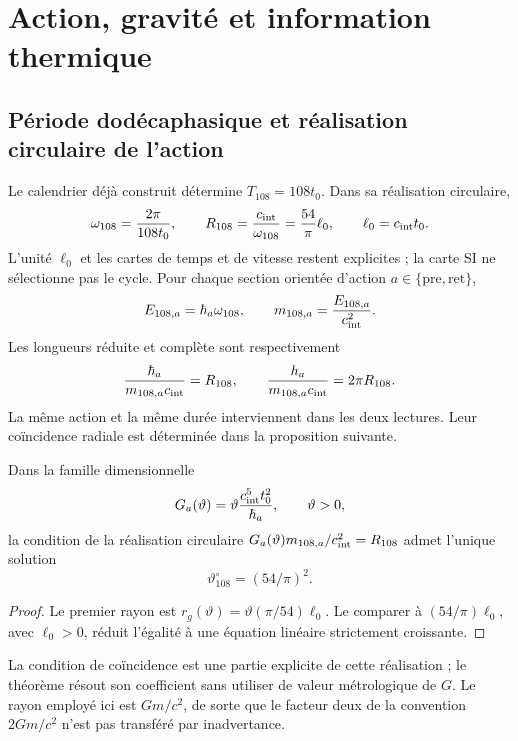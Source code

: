\section{Action, gravité et information thermique}
\label{ii:sec:gravity}
\subsection{Période dodécaphasique et réalisation circulaire de l'action}
Le calendrier déjà construit détermine $T_{108}=108t_0$.
Dans sa réalisation circulaire,
\[
\omega_{108}=\frac{2\pi}{108t_0},\qquad
R_{108}=\frac{c_{\rm int}}{\omega_{108}}
=\frac{54}{\pi}\ell_0,\qquad \ell_0=c_{\rm int}t_0.
\]
L'unité $\ell_0$ et les cartes de temps et de vitesse restent
explicites ; la carte SI ne sélectionne pas le cycle.
Pour chaque section orientée d'action $a\in\{\mathrm{pre},\mathrm{ret}\}$,
\[
E_{108,a}=\hbar_a\omega_{108},\qquad
m_{108,a}=\frac{E_{108,a}}{c_{\rm int}^2}.
\]
Les longueurs réduite et complète sont respectivement
\[
\frac{\hbar_a}{m_{108,a}c_{\rm int}}=R_{108},
\qquad
\frac{h_a}{m_{108,a}c_{\rm int}}=2\pi R_{108}.
\]
La même action et la même durée interviennent dans les deux lectures. Leur coïncidence radiale est déterminée dans la proposition suivante.

\begin{proposition}
Dans la famille dimensionnelle
\[
G_a(\vartheta)=\vartheta\frac{c_{\rm int}^5t_0^2}{\hbar_a},
\qquad \vartheta>0,
\]
la condition de la réalisation circulaire
$G_a(\vartheta)m_{108,a}/c_{\rm int}^2=R_{108}$
admet l'unique solution
\[
\vartheta^\circ_{108}=(54/\pi)^2.
\]
\end{proposition}
\begin{proof}
Le premier rayon est
$r_g(\vartheta)=\vartheta(\pi/54)\ell_0$.
Le comparer à $(54/\pi)\ell_0$, avec $\ell_0>0$, réduit
l'égalité à une équation linéaire strictement croissante.
\end{proof}
La condition de coïncidence est une partie explicite de cette réalisation ;
le théorème résout son coefficient sans utiliser de valeur métrologique de $G$.
Le rayon employé ici est $Gm/c^2$, de sorte que le facteur deux
de la convention $2Gm/c^2$ n'est pas transféré par inadvertance.

